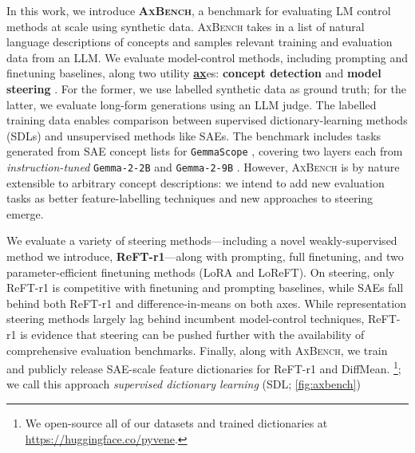 \documentclass{article}
\theoremstyle{plain}
\theoremstyle{definition}
\theoremstyle{remark}
\renewcommand{\cite}{\citep}
\newcommand{\shortbenchmark}{\textsc{AxBench}}
\newcommand{\methodtag}[2]{%
  \tikz[baseline=(char.base)]{%
    \node[
      fill=#1,
      rounded corners=2pt,
      text=white,
      font=\bfseries,
      minimum width=1em,
      minimum height=1em,
      align=center,
      inner sep=0pt
    ](char){#2};%
  }%
}
\newcommand{\concepttag}{\protect\methodtag{conceptcolor}{C}}
\newcommand{\steeringtag}{\protect\methodtag{steeringcolor}{S}}
\begin{document}

In this work, we introduce \textbf{\shortbenchmark{}}, a benchmark for evaluating LM control methods at scale using synthetic data. \shortbenchmark{} takes in a list of natural language descriptions of concepts and samples relevant training and evaluation data from an LLM. We evaluate model-control methods, including prompting and finetuning baselines, along two utility \underline{\textbf{ax}}es: \textbf{concept detection} \concepttag{} and \textbf{model steering} \steeringtag{}. For the former, we use labelled synthetic data as ground truth; for the latter, we evaluate long-form generations using an LLM judge. The labelled training data enables comparison between supervised dictionary-learning methods (SDLs) and unsupervised methods like SAEs. The benchmark includes tasks generated from SAE concept lists for \texttt{GemmaScope} \cite{lieberum-etal-2024-gemma}, covering two layers each from \emph{instruction-tuned} \texttt{Gemma-2-2B} and \texttt{Gemma-2-9B} \cite{gemmateam2024gemma2improvingopen}. However, \shortbenchmark{} is by nature extensible to arbitrary concept descriptions: we intend to add new evaluation tasks as better feature-labelling techniques and new approaches to steering emerge.

We evaluate a variety of steering methods---including a novel weakly-supervised method we introduce, \textbf{ReFT-r1}---along with prompting, full finetuning, and two parameter-efficient finetuning methods (LoRA and LoReFT). On steering, only ReFT-r1 is competitive with finetuning and prompting baselines, while SAEs fall behind both ReFT-r1 and difference-in-means \citep{marks2024geometrytruthemergentlinear} on both axes. While representation steering methods largely lag behind incumbent model-control techniques, ReFT-r1 is evidence that steering can be pushed further with the availability of comprehensive evaluation benchmarks. Finally, along with \shortbenchmark{}, we train and publicly release SAE-scale feature dictionaries for ReFT-r1 and DiffMean.
\footnote{We open-source all of our datasets and trained dictionaries at \url{https://huggingface.co/pyvene}.}; we call this approach \textit{supervised dictionary learning} (SDL; \cref{fig:axbench})
\end{document}
